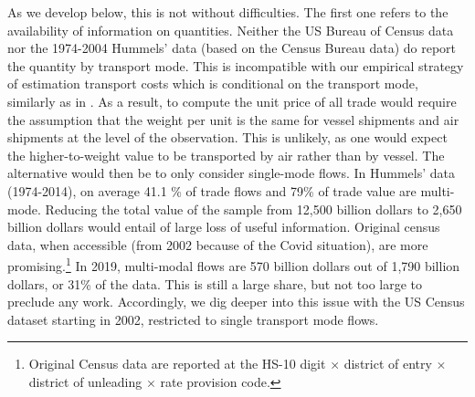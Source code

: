 \documentclass[11pt,twoside, authoryear]{elsarticle}
\begin{document}
As we develop below, this is not without difficulties. The first one refers to the availability of information on quantities. Neither the US Bureau of Census data nor the 1974-2004 Hummels' data (based on the Census Bureau data) do report the quantity by transport mode. This is incompatible with our empirical strategy of estimation transport costs which is conditional on the transport mode, similarly as in \cite{hummels2007}. As a result, to compute the unit price of all trade would require the assumption that the weight per unit is the same for vessel shipments and air shipments at the level of the observation. This is unlikely, as one would expect the higher-to-weight value to be transported by air rather than by vessel. The alternative would then be to only consider single-mode flows. In Hummels' data (1974-2014), on average 41.1 \% of trade flows and 79\% of trade value are multi-mode. Reducing the total value of the sample from 12,500 billion dollars to 2,650 billion dollars would entail of large loss of useful information. Original census data, when accessible (from 2002 because of the Covid situation), are more promising.\footnote{Original Census data are  reported at the HS-10 digit $\times$ district of entry $\times$ district of unleading $\times$ rate provision code.} In 2019, multi-modal flows are 570 billion dollars out of 1,790 billion dollars, or 31\% of the data. This is still a large share, but not too large to preclude any work. Accordingly, we dig deeper into this issue with the US Census dataset starting in 2002, restricted to single transport mode flows. \smallskip
\end{document}
